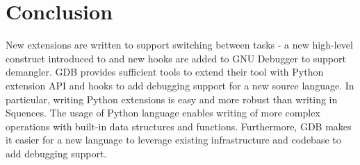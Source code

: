 \chapter{Conclusion}
New extensions are written to support switching between tasks - a new
high-level construct introduced to \uCPP and new hooks are added to GNU
Debugger to support \CFA demangler. GDB provides sufficient tools to extend
their tool with Python extension API and hooks to add debugging support for a
new source language. In particular, writing Python extensions is easy and more
robust than writing in Squences. The usage of Python language enables writing of
more complex operations with built-in data structures and functions.
Furthermore, GDB makes it easier for a new language to leverage existing
infrastructure and codebase to add debugging support.
